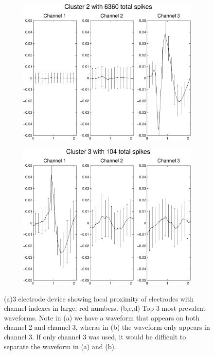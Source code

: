 \begin{center}
\begin{figure}
\begin{subfigure}[b]{.24\textwidth}
\includegraphics[width=\textwidth]{../figs/3devim/clus2}
\caption{}
\label{ex32}
\end{subfigure}
\begin{subfigure}[b]{.24\textwidth}
\includegraphics[width=\textwidth]{../figs/3devim/clus3}
\caption{}
\label{ex33}
\end{subfigure}
\caption{(a)3 electrode device showing local proximity of electrodes with channel indexes in large, red numbers. (b,c,d) Top 3 most prevalent waveforms.  Note in (a) we have a waveform that appears on both channel 2 and channel 3, wheras in (b) the waveform only appears in channel 3.  If only channel 3 was used, it would be difficult to separate the waveform in (a) and (b).}
\end{figure}
\end{center}
